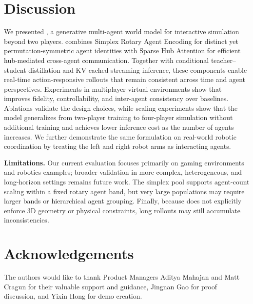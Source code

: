 \section{Discussion}
We presented \ours, a generative multi-agent world model for interactive simulation beyond two players.
\ours combines Simplex Rotary Agent Encoding for distinct yet permutation-symmetric agent identities with Sparse Hub Attention for efficient hub-mediated cross-agent communication.
Together with conditional teacher--student distillation and KV-cached streaming inference, these components enable real-time action-responsive rollouts that remain consistent across time and agent perspectives.
Experiments in multiplayer virtual environments show that \ours improves fidelity, controllability, and inter-agent consistency over baselines.
Ablations validate the design choices, while scaling experiments show that the model generalizes from two-player training to four-player simulation without additional training and achieves lower inference cost as the number of agents increases.
We further demonstrate the same formulation on real-world robotic coordination by treating the left and right robot arms as interacting agents.

\noindent\textbf{Limitations.}
Our current evaluation focuses primarily on gaming environments and robotics examples; broader validation in more complex, heterogeneous, and long-horizon settings remains future work.
The simplex pool supports agent-count scaling within a fixed rotary agent band, but very large populations may require larger bands or hierarchical agent grouping. Finally, because \ours does not explicitly enforce 3D geometry or physical constraints, long rollouts may still accumulate inconsistencies.

\section*{Acknowledgements}
The authors would like to thank Product Managers Aditya Mahajan and Matt Cragun for their valuable support and guidance, Jingnan Gao for proof discussion, and Yixin Hong for demo creation.